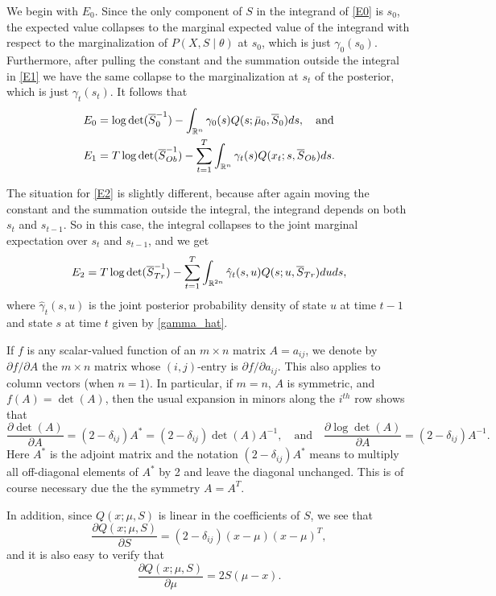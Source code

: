 \documentclass[12pt,leqno]{article}
\begin{document}
We begin with $E_0$. Since the only component of $S$ in the integrand of \eqref{E0} is $s_0$, the expected value
collapses to the marginal 
expected value of the integrand with respect to the marginalization of $P(X,S\mid\theta)$ at $s_0$, which is just 
$\gamma_0(s_0)$.  Furthermore, after pulling the constant and the summation 
outside the integral in \eqref{E1} we have the same collapse to the marginalization at $s_t$ of the posterior, which
is just $\gamma_t(s_t)$.  It follows that
\begin{align*}
E_0 &= \log\det(\overline{S}^{-1}_0) - \int_{{\mathbb R}^n}\gamma_0(s)Q(s;\bar{\mu}_0,\overline{S}_0)ds,\quad\text{and}\\
E_1 &= T\log\det(\overline{S}^{-1}_{Ob}) - \sum_{t=1}^T\int_{{\mathbb R}^n}\gamma_t(s)Q(x_t;s,\overline{S}_{Ob})ds.
\end{align*}

The situation for \eqref{E2} is slightly different, because after again moving the constant and the summation outside
the integral, the integrand depends on both $s_t$ and $s_{t-1}$.  So in this case, the integral collapses to the 
joint marginal expectation over $s_t$ and $s_{t-1}$, and we get
$$
E_2 = T\log\det(\overline{S}^{-1}_{Tr}) - \sum_{t=1}^T\int_{{\mathbb R}^{2n}}\hat{\gamma}_t(s,u)Q(s;u,\overline{S}_{Tr})duds,
$$
where $\hat{\gamma}_t(s,u)$ is the joint posterior probability density of state $u$ at time $t-1$ and state $s$ 
at time $t$ given by \eqref{gamma_hat}.

If $f$ is any scalar-valued function of an $m\times{n}$ matrix $A = a_{ij}$, we denote by $\partial{f}/\partial{A}$ the 
$m\times{n}$ matrix whose $(i,j)$-entry is $\partial{f}/\partial{a_{ij}}$.  This also applies to column vectors (when $n=1$).
In particular, if $m=n$, $A$ is symmetric, and $f(A) = \det(A)$,  then the usual expansion 
in minors along the $i^{th}$ row shows that 
$$
\frac{\partial{\det(A)}}{\partial{A}} = (2-\delta_{ij})A^* = (2-\delta_{ij})\det(A)A^{-1},\quad\text{and}
\quad\frac{\partial{\log\det(A)}}{\partial{A}} = (2-\delta_{ij})A^{-1}. 
$$
Here $A^*$ is the adjoint matrix and the notation $(2-\delta_{ij})A^*$ means to multiply all off-diagonal elements of $A^*$ by 2
and leave the diagonal unchanged.  This is of course necessary due the the symmetry $A = A^T$.

In addition, since $Q(x;\mu,S)$ is linear in the coefficients of $S$, we see that
$$
\frac{\partial{Q(x;\mu,S)}}{\partial{S}} = (2-\delta_{ij})(x-\mu)(x-\mu)^T,
$$
and it is also easy to verify that
$$
\frac{\partial{Q(x;\mu,S)}}{\partial{\mu}} = 2S(\mu-x).
$$
\end{document}
